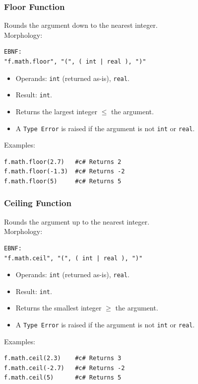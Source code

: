 \subsubsection{Floor Function}
Rounds the argument down to the nearest integer. \\
Morphology:
\begin{verbatim}
EBNF:
"f.math.floor", "(", ( int | real ), ")"
\end{verbatim}
\begin{itemize}
\item Operands: \texttt{int} (returned as-is), \texttt{real}.
\item Result: \texttt{int}.
\item Returns the largest integer $\leq$ the argument.
\item A \texttt{Type Error} is raised if the argument is not \texttt{int} or \texttt{real}.
\end{itemize}
Examples:
\begin{verbatim}
f.math.floor(2.7)   #c# Returns 2
f.math.floor(-1.3)  #c# Returns -2
f.math.floor(5)     #c# Returns 5
\end{verbatim}

\subsubsection{Ceiling Function}
Rounds the argument up to the nearest integer. \\
Morphology:
\begin{verbatim}
EBNF:
"f.math.ceil", "(", ( int | real ), ")"
\end{verbatim}
\begin{itemize}
\item Operands: \texttt{int} (returned as-is), \texttt{real}.
\item Result: \texttt{int}.
\item Returns the smallest integer $\geq$ the argument.
\item A \texttt{Type Error} is raised if the argument is not \texttt{int} or \texttt{real}.
\end{itemize}
Examples:
\begin{verbatim}
f.math.ceil(2.3)    #c# Returns 3
f.math.ceil(-2.7)   #c# Returns -2
f.math.ceil(5)      #c# Returns 5
\end{verbatim}

